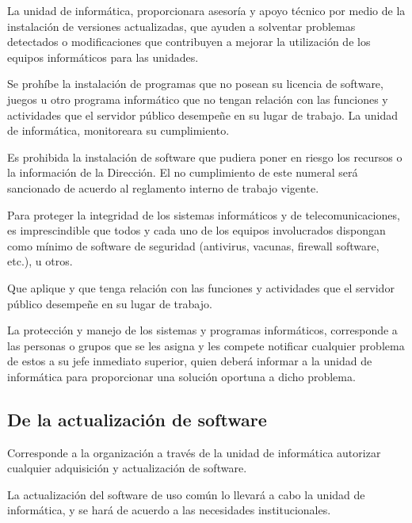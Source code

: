 \documentclass{book}
\begin{document}
                La unidad de informática, proporcionara asesoría y apoyo técnico por medio de
                la instalación de versiones actualizadas, que ayuden a solventar problemas detectados o
                modificaciones que contribuyen a mejorar la utilización de los equipos informáticos
                para las unidades.

                Se prohíbe la instalación de programas que no posean su licencia de software,
                juegos u otro programa informático que no tengan relación con las funciones y
                actividades que el servidor público desempeñe en su lugar de trabajo. La unidad de
                informática, monitoreara su cumplimiento.

                Es prohibida la instalación de software que pudiera poner en riesgo los recursos
                o la información de la Dirección. El no cumplimiento de este numeral será sancionado
                de acuerdo al reglamento interno de trabajo vigente.

                Para proteger la integridad de los sistemas informáticos y de
                telecomunicaciones, es imprescindible que todos y cada uno de los equipos
                involucrados dispongan como mínimo de software de seguridad (antivirus, vacunas,
                firewall software, etc.), u otros.

                Que aplique y que tenga relación con las funciones y actividades que el servidor
                público desempeñe en su lugar de trabajo.

                La protección y manejo de los sistemas y programas informáticos, corresponde a
                las personas o grupos que se les asigna y les compete notificar cualquier problema de
                estos a su jefe inmediato superior, quien deberá informar a la unidad de informática para
                proporcionar una solución oportuna a dicho problema.
            \

            \subsection{De la actualización de software}
                Corresponde a la organización a través de la unidad de informática autorizar
                cualquier adquisición y actualización de software.

                La actualización del software de uso común lo llevará a cabo la unidad de
                informática, y se hará de acuerdo a las necesidades institucionales.
            \
\end{document}
